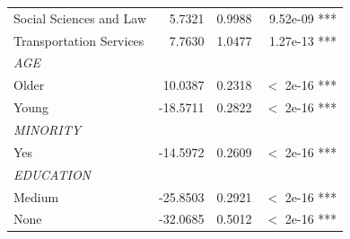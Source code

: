 \documentclass[12pt]{article}
\begin{document}
\begin{table}[ht]
\begin{tabular}{@{}lrrr@{}}
\quad Social Sciences and Law & 5.7321 & 0.9988 & 9.52e-09 *** \\
\quad Transportation Services & 7.7630 & 1.0477 & 1.27e-13 *** \\
\textit{AGE} & & & \\
\quad Older & 10.0387 & 0.2318 & $<$ 2e-16 *** \\
\quad Young & -18.5711 & 0.2822 & $<$ 2e-16 *** \\
\textit{MINORITY} & & & \\
\quad Yes & -14.5972 & 0.2609 & $<$ 2e-16 *** \\
\textit{EDUCATION} & & & \\
\quad Medium & -25.8503 & 0.2921 & $<$ 2e-16 *** \\
\quad None & -32.0685 & 0.5012 & $<$ 2e-16 *** \\
\bottomrule
\end{tabular}
\end{table}
\end{document}
